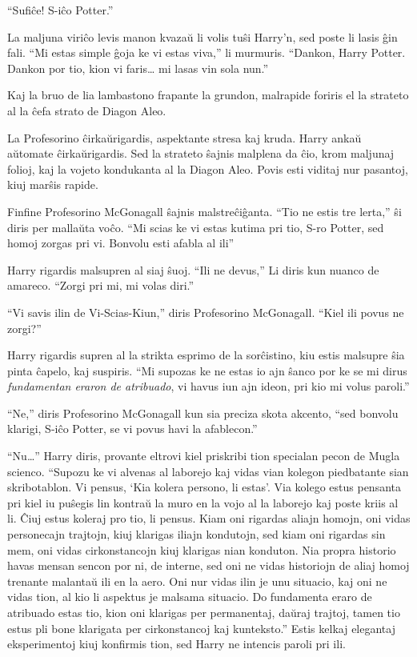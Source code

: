 ``Sufiĉe! S-iĉo Potter.''

La maljuna viriĉo levis manon kvazaŭ li volis tuŝi Harry'n, sed poste li
lasis ĝin fali. ``Mi estas simple ĝoja ke vi estas viva,'' li
murmuris. ``Dankon, Harry Potter. Dankon por tio, kion vi faris\ldots
mi lasas vin sola nun.''

Kaj la bruo de lia lambastono frapante la grundon, malrapide foriris
el la strateto al la ĉefa strato de Diagon Aleo.

La Profesorino ĉirkaŭrigardis, aspektante stresa kaj kruda. Harry
ankaŭ aŭtomate ĉirkaŭrigardis. Sed la strateto ŝajnis malplena da ĉio,
krom maljunaj folioj, kaj la vojeto kondukanta al la Diagon Aleo.
Povis esti viditaj nur pasantoj, kiuj marŝis rapide.

Finfine Profesorino McGonagall ŝajnis malstreĉiĝanta. ``Tio ne estis
tre lerta,'' ŝi diris per mallaŭta voĉo. ``Mi scias ke vi estas kutima
pri tio, S-ro Potter, sed homoj zorgas pri vi. Bonvolu esti afabla al
ili''

Harry rigardis malsupren al siaj ŝuoj. ``Ili ne devus,'' Li diris kun
nuanco de amareco. ``Zorgi pri mi, mi volas diri.''

``Vi savis ilin de Vi-Scias-Kiun,'' diris Profesorino
McGonagall. ``Kiel ili povus ne zorgi?''

Harry rigardis supren al la strikta esprimo de la sorĉistino, kiu
estis malsupre ŝia pinta ĉapelo, kaj suspiris. ``Mi supozas ke ne
estas io ajn ŝanco por ke se mi dirus \emph{fundamentan eraron de
atribuado}, vi havus iun ajn ideon, pri kio mi volus paroli.''

``Ne,'' diris Profesorino McGonagall kun sia preciza skota
akcento, ``sed bonvolu klarigi, S-iĉo Potter, se vi povus havi la
afablecon.''

``Nu\ldots'' Harry diris, provante eltrovi kiel priskribi tion
specialan pecon de Mugla scienco. ``Supozu ke vi alvenas al laborejo
kaj vidas vian kolegon piedbatante sian skribotablon. Vi pensus, `Kia
kolera persono, li estas'. Via kolego estus pensanta pri kiel iu
puŝegis lin kontraŭ la muro en la vojo al la laborejo kaj poste kriis
al li. Ĉiuj estus koleraj pro tio, li pensus. Kiam oni rigardas aliajn
homojn, oni vidas personecajn trajtojn, kiuj klarigas iliajn
kondutojn, sed kiam oni rigardas sin mem, oni vidas cirkonstancojn
kiuj klarigas nian konduton.  Nia propra historio havas mensan sencon
por ni, de interne, sed oni ne vidas historiojn de aliaj homoj
trenante malantaŭ ili en la aero. Oni nur vidas ilin je unu situacio,
kaj oni ne vidas tion, al kio li aspektus je malsama situacio. Do
fundamenta eraro de atribuado estas tio, kion oni klarigas per
permanentaj, daŭraj trajtoj, tamen tio estus pli bone klarigata per
cirkonstancoj kaj kunteksto.'' Estis kelkaj elegantaj eksperimentoj
kiuj konfirmis tion, sed Harry ne intencis paroli pri ili.

